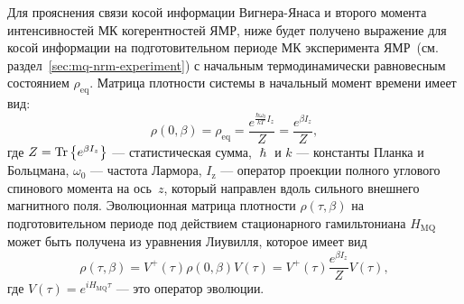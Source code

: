 Для прояснения связи косой информации Вигнера-Янаса и
второго момента интенсивностей МК когерентностей ЯМР,
ниже будет получено выражение для косой информации
на подготовительном периоде МК эксперимента ЯМР~(см. раздел~\ref{sec:mq-nrm-experiment})
с начальным термодинамически равновесным состоянием $\rho_\mathrm{eq}$.
Матрица плотности системы в начальный момент времени имеет вид:
\begin{equation}
  \rho(0, \beta)
  = \rho_\mathrm{eq}
  = \dfrac{e^{\frac{\hbar\omega_{0}}{kT} I_z}}{Z}
  = \dfrac{e^{\beta I_z}}{Z},
\end{equation}
где $Z = \mathrm{Tr} \left\{ e^{\beta I_z} \right\}$ --- статистическая сумма,
$\hslash$ и $k$ --- константы Планка и Больцмана,
$\omega_{0}$ --- частота Лармора,
$I_\mathrm{z}$ ---  оператор проекции полного углового спинового момента  на ось~$z$,
который направлен вдоль сильного внешнего магнитного поля.
Эволюционная матрица плотности $\rho(\tau,\beta)$ на подготовительном периоде
под действием стационарного гамильтониана $H_\mathrm{MQ}$
может быть получена из уравнения Лиувилля,
которое имеет вид
%
\begin{equation}\label{eq:rho-eval}
  \rho(\tau,\beta)
  = V^+(\tau) \rho(0, \beta) V(\tau)
  = V^+(\tau) \frac{e^{\beta I_z}}{Z} V(\tau),
\end{equation}
где $V(\tau) = e^{iH_\mathrm{MQ}\tau}$
--- это оператор эволюции.

